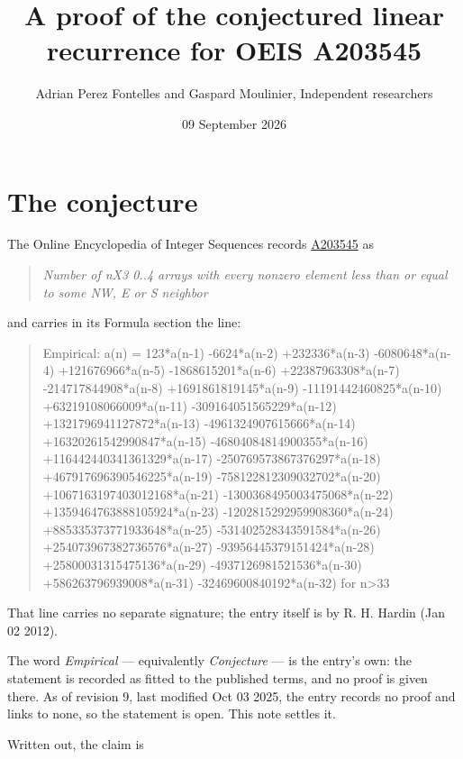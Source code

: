 \documentclass[11pt]{article}
\title{A proof of the conjectured linear recurrence for OEIS A203545}
\author{Adrian Perez Fontelles and Gaspard Moulinier, Independent researchers}
\date{09 September 2026}
\theoremstyle{definition}
\begin{document}
\maketitle
\section{The conjecture}

The Online Encyclopedia of Integer Sequences records \href{https://oeis.org/A203545}{A203545} as

\begin{quote}\itshape Number of nX3 0..4 arrays with every nonzero element less than or equal to some NW, E or S neighbor\end{quote}

and carries in its Formula section the line:

\begin{quote}\ttfamily Empirical: a(n) = 123*a(n-1) -6624*a(n-2) +232336*a(n-3) -6080648*a(n-4) +121676966*a(n-5) -1868615201*a(n-6) +22387963308*a(n-7) -214717844908*a(n-8) +1691861819145*a(n-9) -11191442460825*a(n-10) +63219108066009*a(n-11) -309164051565229*a(n-12) +1321796941127872*a(n-13) -4961324907615666*a(n-14) +16320261542990847*a(n-15) -46804084814900355*a(n-16) +116442440341361329*a(n-17) -250769573867376297*a(n-18) +467917696390546225*a(n-19) -758122812309032702*a(n-20) +1067163197403012168*a(n-21) -1300368495003475068*a(n-22) +1359464763888105924*a(n-23) -1202815292959908360*a(n-24) +885335373771933648*a(n-25) -531402528343591584*a(n-26) +254073967382736576*a(n-27) -93956445379151424*a(n-28) +25800031315475136*a(n-29) -4937126981521536*a(n-30) +586263796939008*a(n-31) -32469600840192*a(n-32) for n>33\end{quote}

That line carries no separate signature; the entry itself is by R. H. Hardin (Jan 02 2012).

The word {\itshape Empirical} --- equivalently {\itshape Conjecture} --- is the entry's own: the statement is recorded as fitted to the published terms, and no proof is given there. As of revision 9, last modified Oct 03 2025, the entry records no proof and links to none, so the statement is open. This note settles it.

Written out, the claim is
\end{document}
